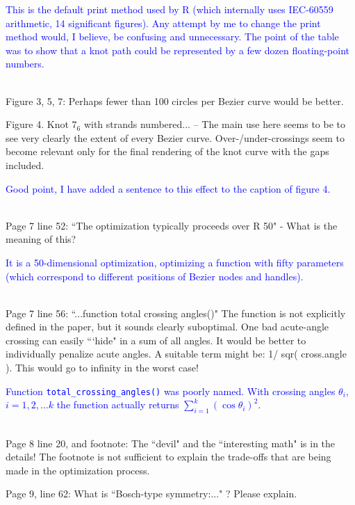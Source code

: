 \documentclass[12pt]{article}
\begin{document}
\textcolor{blue}{This is the default print method used by R (which
  internally uses IEC-60559 arithmetic, 14 significant figures).  Any
  attempt by me to change the print method would, I believe, be
  confusing and unnecessary.  The point of the table was to show that
  a knot path could be represented by a few dozen floating-point
  numbers.\\ \\}

Figure 3, 5, 7: Perhaps fewer than 100 circles per Bezier curve would
be better.


Figure 4.  Knot $7_6$ with strands numbered... -- The main use here seems
to be to see very clearly the extent of every Bezier curve.
Over-/under-crossings seem to become relevant only for the final
rendering of the knot curve with the gaps included.

\textcolor{blue}{Good point, I have added a sentence to this effect to
  the caption of figure 4.\\ \\}

Page 7 line 52: ``The optimization typically proceeds over R 50" - What
is the meaning of this?

\textcolor{blue}{It is a 50-dimensional optimization, optimizing a
  function with fifty parameters (which correspond to different
  positions of Bezier nodes and handles).\\ \\}

Page 7 line 56: ``...function total crossing angles()" The function is
not explicitly defined in the paper, but it sounds clearly suboptimal.
One bad acute-angle crossing can easily ```hide" in a sum of all angles.
It would be better to individually penalize acute angles.  A suitable
term might be: 1/ sqr( cross.angle ).  This would go to infinity in
the worst case!

\textcolor{blue}{Function {\tt total\_crossing\_angles()} was poorly
  named.  With crossing angles $\theta_i$, $i=1,2,\ldots k$ the
  function actually returns $\sum_{i=1}^k\left(\cos\theta_i\right)^2$.
  \\ \\}

Page 8 line 20, and footnote: The ``devil" and the ``interesting math"
is in the details!  The footnote is not sufficient to explain the
trade-offs that are being made in the optimization process.

Page 9, line 62: What is ``Bosch-type symmetry:..." ?  Please explain.
\end{document}
